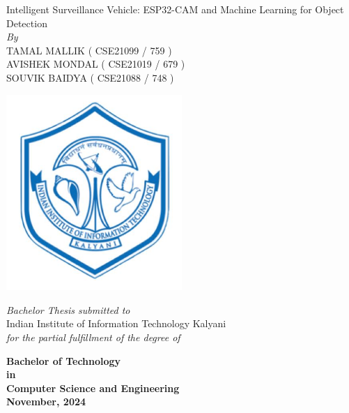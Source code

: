 \documentclass[12pt,a4paper]{report}
\newcommand{\mytitle}{Intelligent Surveillance Vehicle: ESP32-CAM and Machine Learning for Object Detection}
\newcommand{\mySpace}{0.6cm}
\newcommand{\mySpaceHalf}{0.5cm}
\begin{document}
\clearpage
	\begin{titlepage}

    \centering
    {\Huge \mytitle \fontsize{24}{28.8}\selectfont {}\selectfont}\\
\vspace{\mySpace}
    \large \textit{By}\\
\vspace{\mySpace}
    {\Large TAMAL MALLIK ( CSE21099 / 759 ) \\
    \vspace{0.1cm}
    AVISHEK MONDAL ( CSE21019 / 679 ) \\
    \vspace{0.1cm}
    SOUVIK BAIDYA ( CSE21088  / 748 ) \\
    \fontsize{18}{22}\selectfont {}\selectfont
\vspace{\mySpace}}
    \begin{center}
        \includegraphics[width=0.5\textwidth]{iiitk_logo} %
    \end{center}
    {\Large \textit{Bachelor Thesis submitted to}\\
    \vspace{\mySpaceHalf}
    Indian Institute of Information Technology Kalyani \\ \vspace{\mySpaceHalf}
	 \textit{for the partial fulfillment of the degree of}\\ \vspace{\mySpaceHalf}

{\bfseries %
	 Bachelor of Technology \\ 
	 in \\
	 Computer Science and Engineering\\ \vspace{\mySpaceHalf}
	  November, 2024 \fontsize{18}{22}}\selectfont {}\selectfont}
    \vspace*{\fill}
\end{titlepage}
\restoregeometry
\end{document}

